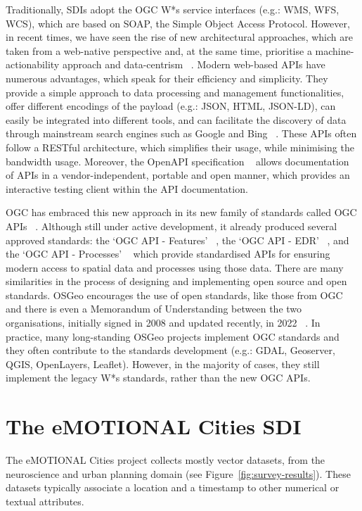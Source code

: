 \documentclass{isprs} %
\begin{document}
Traditionally, SDIs adopt the OGC W*s service interfaces (e.g.: WMS, WFS, WCS), which are based on SOAP, the Simple Object Access Protocol. However, in recent times, we have seen the rise of new architectural approaches, which are taken from a web-native perspective and, at the same time, prioritise a machine-actionability approach and data-centrism ~\cite{simoes2021}. Modern web-based APIs have numerous advantages, which speak for their efficiency and simplicity. They provide a simple approach to data processing and management functionalities, offer different encodings of the payload (e.g.: JSON, HTML, JSON-LD), can easily be integrated into different tools, and can facilitate the discovery of data through mainstream search engines such as Google and Bing ~\cite{kotsev2022}. These APIs often follow a RESTful architecture, which simplifies their usage, while minimising the bandwidth usage. Moreover, the OpenAPI specification ~\cite{openapi2011} allows documentation of APIs in a vendor-independent, portable and open manner, which provides an interactive testing client within the API documentation.

OGC has embraced this new approach in its new family of standards called OGC APIs ~\cite{ogc2020}. Although still under active development, it already produced several approved standards: the ‘OGC API - Features’ ~\cite{ogcfeatures2022}, the ‘OGC API - EDR’ ~\cite{ogcedr2022}, and the ‘OGC API - Processes’ ~\cite{ogcprocesses2022} which provide standardised APIs for ensuring modern access to spatial data and processes using those data.
There are many similarities in the process of designing and implementing open source and open standards. OSGeo encourages the use of open standards, like those from OGC and there is even a Memorandum of Understanding between the two organisations, initially signed in 2008 and updated recently, in 2022 ~\cite{osgeo2022,ogcmemorandum2022}. In practice, many long-standing OSGeo projects implement OGC standards and they often contribute to the standards development (e.g.: GDAL, Geoserver, QGIS, OpenLayers, Leaflet). However, in the majority of cases, they still implement the legacy W*s standards, rather than the new OGC APIs.

\section{The eMOTIONAL Cities SDI}\label{sec:EC-SDI}

The eMOTIONAL Cities project collects mostly vector datasets, from the neuroscience and urban planning domain (see Figure~\ref{fig:survey-results}). These datasets typically associate a location and a timestamp to other numerical or textual attributes.
\end{document}
